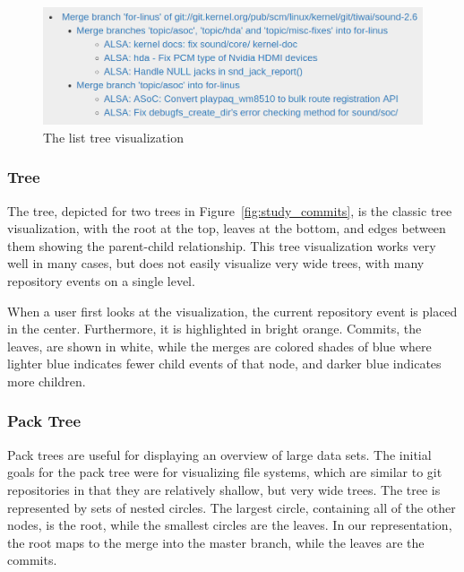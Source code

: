 \begin{figure}
        \centering
        \includegraphics[width=0.9\linewidth]{figures/linvis/linvis_list_tree.png}
        \caption{The list tree visualization}
        \label{fig:linvis_list_tree}
\end{figure}

\subsubsection{\rt Tree}

The \rt tree\cite{Reingold1981}, depicted for two trees in
Figure~\ref{fig:study_commits}, is the classic tree visualization, with
the root at the top, leaves at the bottom, and edges between them
showing the parent-child relationship. This tree visualization works
very well in many cases, but does not easily visualize very wide trees,
with many repository events on a single level.

When a user first looks at the visualization, the current repository
event is placed in the center. Furthermore, it is highlighted in bright
orange. Commits, the leaves, are shown in white, while the merges are
colored shades of blue where lighter blue indicates fewer child events
of that node, and darker blue indicates more children.

\subsubsection{Pack Tree}

Pack trees\cite{Wang2006} are useful for displaying an overview of large
data sets. The initial goals for the pack tree were for visualizing file
systems, which are similar to git repositories in that they are
relatively shallow, but very wide trees. The tree is represented by sets
of nested circles. The largest circle, containing all of the other
nodes, is the root, while the smallest circles are the leaves. In our
representation, the root maps to the merge into the master branch, while
the leaves are the commits.


